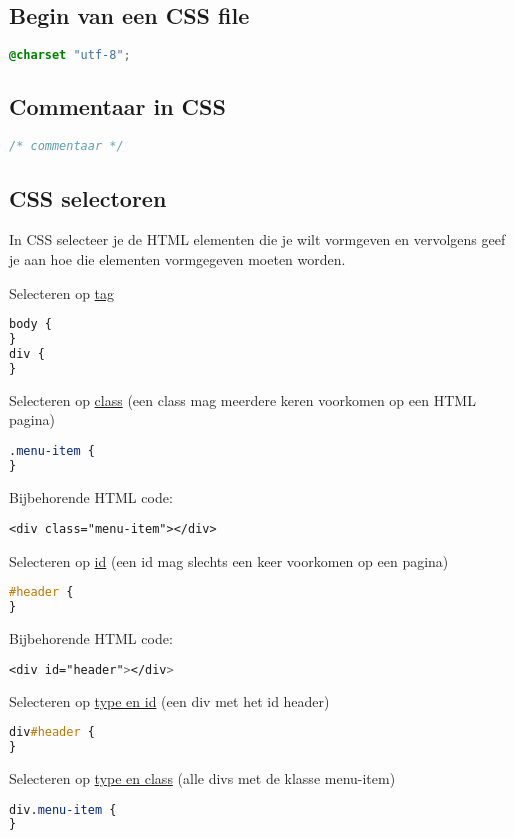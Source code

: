 \documentclass[8pt,pagesize,footinclude=false,headinclude=false]{scrartcl}
\begin{document}
\begin{multicols*}{4}
\subsection*{Begin van een CSS file}
\begin{lstlisting}[language=CSS]
@charset "utf-8";
\end{lstlisting}

\subsection*{Commentaar in CSS}
\begin{lstlisting}[language=CSS]
/* commentaar */
\end{lstlisting}

\subsection*{CSS selectoren}
In CSS selecteer je de HTML elementen die je wilt vormgeven en vervolgens geef je aan hoe die elementen vormgegeven moeten worden.

\noindent Selecteren op \underline{tag}
\begin{lstlisting}[language=CSS]
body {
}
div {
}
\end{lstlisting}

\noindent Selecteren op \underline{class} (een class mag meerdere keren voorkomen op een HTML pagina)
\begin{lstlisting}[language=CSS]
.menu-item {
}
\end{lstlisting}
\noindent Bijbehorende HTML code:
\begin{lstlisting}[language=HTML5]
<div class="menu-item"></div>
\end{lstlisting}

\noindent Selecteren op \underline{id} (een id mag slechts een keer voorkomen op een pagina)
\begin{lstlisting}[language=CSS]
#header {
}
\end{lstlisting}
\noindent Bijbehorende HTML code:
\begin{lstlisting}[language=CSS]
<div id="header"></div>
\end{lstlisting}

\noindent Selecteren op \underline{type en id} (een div met het id header)
\begin{lstlisting}[language=CSS]
div#header {
}
\end{lstlisting}

\noindent Selecteren op \underline{type en class} (alle divs met de klasse menu-item)
\begin{lstlisting}[language=CSS]
div.menu-item {
}
\end{lstlisting}


\end{multicols*}
\end{document}
